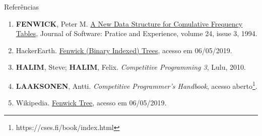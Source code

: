 \begin{frame}[fragile]{Referências}

    \begin{enumerate}
        \item \textbf{FENWICK}, Peter M. \href{http://citeseerx.ist.psu.edu/viewdoc/download?doi=10.1.1.14.8917&rep=rep1&type=pdf}{A New Data Structure for Comulative Frequency Tables}, Journal of Software: Pratice and Experience, volume 24, issue 3, 1994.

        \item HackerEarth. \href{https://www.hackerearth.com/pt-br/practice/data-structures/advanced-data-structures/fenwick-binary-indexed-trees/tutorial/}{Fenwick (Binary Indexed) Trees}, acesso em 06/05/2019.

        \item \textbf{HALIM}, Steve; \textbf{HALIM}, Felix. \textit{Competitive Programming 3}, Lulu, 2010.

        \item \textbf{LAAKSONEN}, Antti. \textit{Competitive Programmer's Handbook}, acesso aberto\footnote{https://cses.fi/book/index.html}.

        \item Wikipedia. \href{https://en.wikipedia.org/wiki/Fenwick\_tree}{Fenwick Tree}, acesso em 06/05/2019.

    \end{enumerate}

\end{frame}

